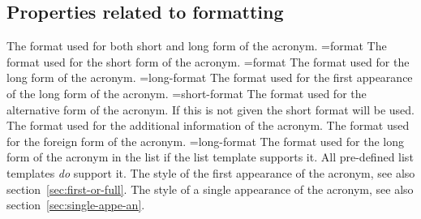 \documentclass{acro-manual}
\begin{document}
\subsection{Properties related to formatting}\label{sec:prop-relat-form}
\begin{properties}
  \Default
    The format used for both short and long form of the acronym.
  \Default={format}
    The format used for the short form of the acronym.
  \Default={format}
    The format used for the long form of the acronym.
  \Default={long-format}
    The format used for the first appearance of the long form of the acronym.
  \Default={short-format}
    The format used for the alternative form of the acronym. If this is not
    given the short format will be used.
  \Default
    The format used for the additional information of the acronym.
  \Default
    The format used for the foreign form of the acronym.
  \Default={long-format}
    The format used for the long form of the acronym in the list if the list
    template supports it. All pre-defined list templates \emph{do} support
    it.
  \Default
    The style of the first appearance of the acronym, see also
    section~\vref{sec:first-or-full}.
  \Default
    The style of a single appearance of the acronym, see also
    section~\vref{sec:single-appe-an}.
\end{properties}
\end{document}
